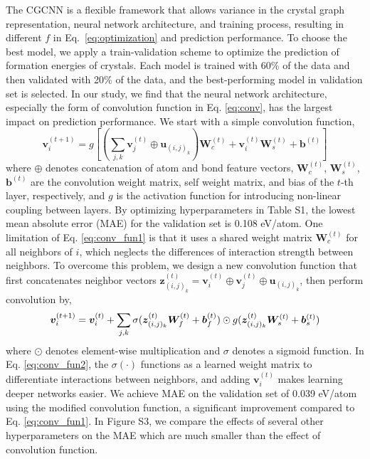 \documentclass[twocolumn, prl]{revtex4-1}
\newcommand{\concat}{\oplus}
\begin{document}
The CGCNN is a flexible framework that allows variance in the crystal graph representation, neural network architecture, and training process, resulting in different $f$ in Eq.~\ref{eq:optimization} and prediction performance. To choose the best model, we apply a train-validation scheme to optimize the prediction of formation energies of crystals. Each model is trained with 60\% of the data and then validated with 20\% of the data, and the best-performing model in validation set is selected. In our study, we find that the neural network architecture, especially the form of convolution function in Eq. \ref{eq:conv}, has the largest impact on prediction performance. We start with a simple convolution function,
\small
\begin{equation}\label{eq:conv_fun1}
  \bm{v}_i^{(t+1)} = g\left[ \left( \sum_{j, k} {\bm{v}_j^{(t)} \concat \bm{u}_{(i, j)_k}} \right) \bm{W}_c^{(t)} + \bm{v}_i^{(t)} \bm{W}_s^{(t)} + \bm{b}^{(t)} \right]
\end{equation}
\normalsize
where $\concat$ denotes concatenation of atom and bond feature vectors, $\bm{W}_c^{(t)}$, $\bm{W}_s^{(t)}$, $\bm{b}^{(t)}$ are the convolution weight matrix, self weight matrix, and bias of the $t$-th layer, respectively, and $g$ is the activation function for introducing non-linear coupling between layers. By optimizing hyperparameters in Table S1, the lowest mean absolute error (MAE) for the validation set is 0.108 eV/atom. One limitation of Eq. \ref{eq:conv_fun1} is that it uses a shared weight matrix $\bm{W}_c^{(t)}$ for all neighbors of $i$, which neglects the differences of interaction strength between neighbors. To overcome this problem, we design a new convolution function that first concatenates neighbor vectors $\bm{z}_{(i,j)_k}^{(t)} = \bm{v}_i^{(t)} \concat \bm{v}_j^{(t)} \concat \bm{u}_{(i, j)_k}$, then perform convolution by,
\begin{equation} \label{eq:conv_fun2}
\small
	\bm{v}_i^{(t+1)} = \bm{v}_i^{(t)} + \sum_{j, k} \sigma(\bm{z}_{(i,j)_k}^{(t)} \bm{W}_f^{(t)} + \bm{b}_f^{(t)}) \odot g(\bm{z}_{(i,j)_k}^{(t)} \bm{W}_s^{(t)} + \bm{b}_s^{(t)}) 
\end{equation}
where $\odot$ denotes element-wise multiplication and $\sigma$ denotes a sigmoid function. In Eq. \ref{eq:conv_fun2}, the $\sigma(\bm{\cdot})$ functions as a learned weight matrix to differentiate interactions between neighbors, and adding $\bm{v}_i^{(t)}$ makes learning deeper networks easier\cite{he2016deep}. We achieve MAE on the validation set of 0.039 eV/atom using the modified convolution function, a significant improvement compared to Eq. \ref{eq:conv_fun1}. In Figure S3, we compare the effects of several other hyperparameters on the MAE which are much smaller than the effect of convolution function. 
\end{document}
